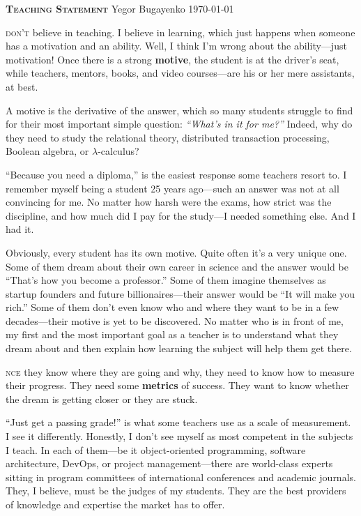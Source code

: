 \documentclass{./yb}
\newcommand\first[2]{\vspace{1em}{\setlength{\parindent}{0pt}\bfseries\LARGE #1}\textsc{#2}}
\begin{document}
{\bfseries\scshape Teaching Statement}\newline
Yegor Bugayenko\newline
\today

\vspace*{12pt}

\first{I}{ don't} believe in teaching. I believe in learning, which
just happens when someone has a motivation and an ability.
Well, I think I'm wrong about the ability---just motivation!
Once there is a strong \textbf{motive}, the student is at the
driver's seat, while teachers, mentors, books, and video
courses---are his or her mere assistants, at best.

A motive is the derivative of the answer, which so many students
struggle to find for their most important simple
question: \emph{``What's in it for me?''}
Indeed, why do they need to study
the relational theory, distributed transaction processing,
Boolean algebra, or $\lambda$-calculus?

``Because you need a diploma,'' is the easiest response some
teachers resort to. I remember myself being a student 25 years ago---such
an answer was not at all convincing for me. No matter how harsh
were the exams, how strict was the discipline, and how much did I pay
for the study---I needed something else. And I had it.

Obviously, every student has its own motive.
Quite often it's a very unique one.
Some of them dream about their own
career in science and the answer would be ``That's how you
become a professor.'' Some of them imagine themselves as startup founders
and future billionaires---their answer would be ``It will make you rich.''
Some of them don't even know who and where they want to be in a few
decades---their motive is yet to be discovered.
No matter who is in front of me, my first and the most
important goal as a teacher is to understand what they dream about
and then explain how learning the subject will help them get there.

\first{O}{nce} they know where they are going and why, they need
to know how to measure their progress.
They need some \textbf{metrics} of success.
They want to know whether the dream is getting closer or they are stuck.

``Just get a passing grade!'' is what some teachers use as a
scale of measurement. I see it differently. Honestly, I don't see myself
as most competent in the subjects I teach. In each of
them---be it object-oriented programming, software architecture, DevOps, or project management---there
are world-class experts sitting in program committees of international conferences and academic journals.
They, I believe, must be the judges of my students.
They are the best providers of knowledge and expertise the market has to offer.
\end{document}
